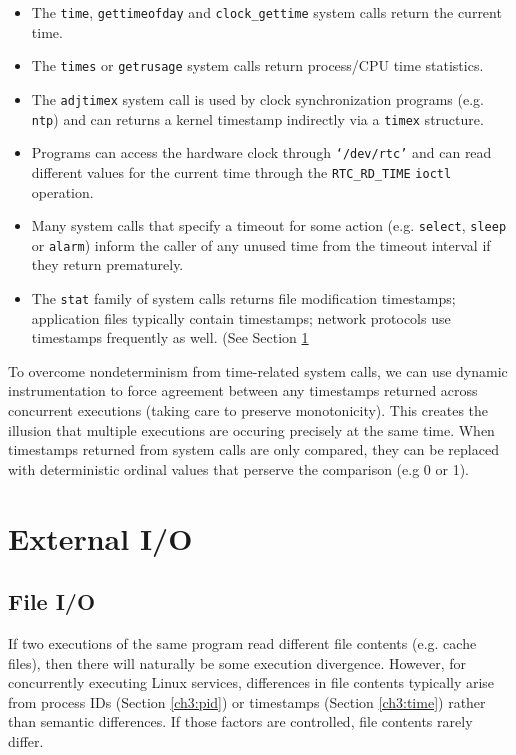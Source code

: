 \begin{itemize}
\item The \texttt{time}, \texttt{gettimeofday} and \texttt{clock\_gettime}
 system calls return the current time.
\item The \texttt{times} or \texttt{getrusage} system calls
return process/CPU time statistics.
\item The \texttt{adjtimex} system call is used 
by clock synchronization programs (e.g. \texttt{ntp}) 
and can returns a kernel timestamp indirectly via 
a \texttt{timex} structure.
\item Programs can access the hardware clock
through \texttt{`/dev/rtc'} and can
read different values for the current time through the \texttt{RTC\_RD\_TIME} \texttt{ioctl}
operation.
\item Many system calls that specify a timeout
for some action (e.g. \texttt{select}, \texttt{sleep} or \texttt{alarm})
inform the caller of any unused time from the timeout interval if they
return prematurely.
\item The \texttt{stat} family of system calls returns file
   modification timestamps;
   application files typically contain timestamps;
   network protocols use timestamps frequently as well.
   (See Section \ref{ch3:filenetio}
\end{itemize}

To overcome nondeterminism from time-related system calls,
we can use dynamic instrumentation to force agreement between 
any timestamps returned across concurrent
executions (taking care to preserve monotonicity).
This creates the illusion that multiple executions
are occuring precisely at the same time. When timestamps
returned from system calls are only compared, they
can be replaced with deterministic ordinal values that 
perserve the comparison (e.g 0 or 1). 

\section{External I/O} \label{ch3:filenetio}
\subsection{File I/O} \label{ch3:fileio}
If two executions of the same program read different
file contents (e.g. cache files), then
there will naturally be some execution divergence.
However, for concurrently executing Linux services,
differences in file contents typically arise
from process IDs (Section \ref{ch3:pid}) or timestamps (Section \ref{ch3:time})
rather than semantic differences.
If those factors are controlled, file contents rarely differ.


